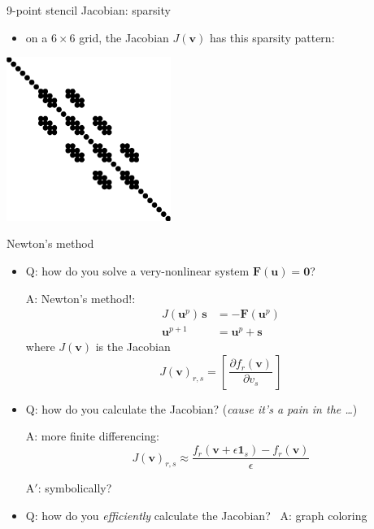 \documentclass[10pt,
               svgnames,
               hyperref={colorlinks,citecolor=DeepPink4,linkcolor=FireBrick,urlcolor=Maroon},
               usepdftitle=false]{beamer}
\newcommand{\bs}{\mathbf{s}}
\newcommand{\bu}{\mathbf{u}}
\newcommand{\bv}{\mathbf{v}}
\newcommand{\bF}{\mathbf{F}}
\newcommand{\bzero}{\bm{0}}
\newcommand{\eps}{\epsilon}
\begin{document}
\begin{frame}{9-point stencil Jacobian: sparsity}
\begin{itemize}
\item on a $6\times 6$ grid, the Jacobian $J(\bv)$ has this sparsity pattern:
\end{itemize}

\bigskip\bigskip
\begin{center}
\includegraphics[width=0.4\textwidth]{images/minimal-spy.png}
\end{center}
\end{frame}


\begin{frame}{Newton's method }
\begin{itemize}
\item Q: how do you solve a very-nonlinear system $\bF(\bu)=\bzero$?

A: Newton's method!:
\begin{align*}
J(\bu^{p})\, \bs &= - \bF(\bu^p) \\
\bu^{p+1} &= \bu^p + \bs
\end{align*}
where $J(\bv)$ is the Jacobian
    $$J(\bv)_{r,s} = \left[\,\frac{\partial f_r(\bv)}{\partial v_s}\,\right]$$

\item<2-3> Q: how do you calculate the Jacobian?  (\emph{cause it's a pain in the \dots})

A: more finite differencing:
    $$J(\bv)_{r,s} \approx \frac{f_r(\bv + \eps \bm{1}_s) - f_r(\bv)}{\eps}$$

A$'$: symbolically?

\item<3> Q: how do you \emph{efficiently} calculate the Jacobian? \, A: graph coloring
\end{itemize}
\end{frame}
\end{document}
